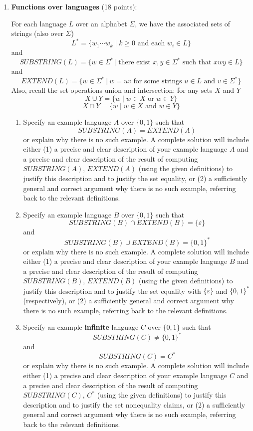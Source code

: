 \begin{enumerate}[wide, labelwidth=!, labelindent=0pt]
\item\textbf{Functions over languages} (18 points):

For each language $L$ over an alphabet $\Sigma$, we have the 
associated sets of strings (also over $\Sigma$)
\[
    L^* = \{ w_1 \cdots w_k \mid k \geq 0 \textrm{ and each } w_i \in L\}
\]
and
\[
    SUBSTRING(L) = \{ w \in \Sigma^* ~|~ \text{there exist } x,y \in \Sigma^* \text{ such that } xwy \in L\}
\]
and 
\[
    EXTEND(L) = \{ w \in \Sigma^* ~|~ w = uv \text{ for some strings } u \in L \text{ and } v \in \Sigma^* \}
\]
Also, recall the set operations union and intersection: for any sets $X$ and $Y$
\[
X \cup Y = \{ w \mid w \in X \text{ or } w \in Y \}
\]
\[
X \cap Y = \{ w \mid w \in X \text{ and } w \in Y \}
\]

    \begin{enumerate}
    \item\gradeComplete Specify an example language $A$ over $\{0,1\}$ such that 
    $$SUBSTRING(A) = EXTEND(A)$$
    or explain why there is no such example. 
    A complete solution will include either (1) a precise and
    clear description of your example language $A$ 
    and a precise and clear description of
    the result of computing $SUBSTRING(A)$, $EXTEND(A)$ (using the given definitions)
    to justify this description and to justify the set equality,
    or (2) a sufficiently general and correct argument
    why there is no such example, referring back to the relevant definitions.

    \item\gradeCorrect Specify an example language $B$ over $\{0,1\}$ such that 
    $$SUBSTRING(B) \cap EXTEND(B) = \{\varepsilon\}$$ and $$SUBSTRING(B) \cup EXTEND(B) = \{0,1\}^*$$
    or explain why there is no such example. 
    A complete solution will include either (1) a precise and
    clear description of your example language $B$ 
    and a precise and clear description of
    the result of computing $SUBSTRING(B)$, $EXTEND(B)$ (using the given definitions)
    to justify this description and to justify the set equality with 
    $\{\varepsilon\}$ and $\{0,1\}^*$ (respectively), or (2) a sufficiently general and correct argument
    why there is no such example, referring back to the relevant definitions.

    \item\gradeCorrect Specify an example {\bf infinite} language $C$ over $\{0,1\}$ such that 
    $$SUBSTRING(C) \neq \{0,1\}^*$$ and $$SUBSTRING(C) = C^*$$or 
    explain why there is no such example.
    A complete solution will include either (1) a precise and
    clear description of your example language $C$ 
    and a precise and clear description of
    the result of computing $SUBSTRING(C)$, $C^*$ (using the given definitions)
    to justify this description and to justify the set nonequality claims, 
    or (2) a sufficiently general and correct argument
    why there is no such example, referring back to the relevant definitions.



\end{enumerate}
\end{enumerate}
